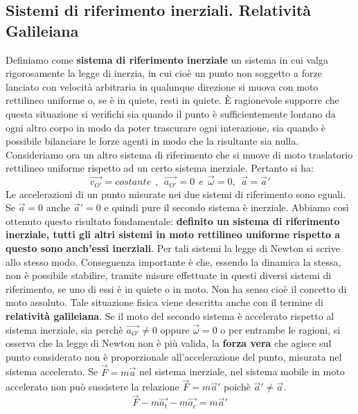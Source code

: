 \documentclass{article}
\numberwithin{equation}{subsection}
\begin{document}
\subsection{Sistemi di riferimento inerziali. Relatività Galileiana}
Definiamo come \textbf{sistema di riferimento inerziale} un sistema in cui valga rigorosamente la legge di inerzia, in cui cioè un punto non soggetto a forze lanciato con velocità arbitraria in qualunque direzione si muova con moto rettilineo uniforme o, se è in quiete, resti in quiete. È ragionevole supporre che questa situazione si verifichi sia quando il punto è sufficientemente lontano da ogni altro corpo in modo da poter trascurare ogni interazione, sia quando è possibile bilanciare le forze agenti in modo che la risultante sia nulla. Consideriamo ora un altro sistema di riferimento che si muove di moto traslatorio rettilineo uniforme rispetto ad un certo sistema inerziale. Pertanto si ha:
\begin{equation}
    \vec{v_{O'}}=costante \ \ ,\ \ \vec{a_{O'}}=0 \ \ e \ \ \vec{\omega}=0 , \ \ \vec{a}=\vec{a}'
\end{equation}
Le accelerazioni di un punto misurate nei due sistemi di riferimento sono eguali. Se $\vec{a}=0$ anche $\vec{a}'=0$ e quindi pure il secondo sistema è inerziale. Abbiamo così ottenuto questo risultato fondamentale: \textbf{definito un sistema di riferimento inerziale, tutti gli altri sistemi in moto rettilineo uniforme rispetto a questo sono anch'essi inerziali}. Per tali sistemi la legge di Newton si scrive allo stesso modo. Conseguenza importante è che, essendo la dinamica la stessa, non è possibile stabilire, tramite misure effettuate in questi diversi sistemi di riferimento, se uno di essi è in quiete o in moto. Non ha senso cioè il concetto di moto assoluto. Tale situazione fisica viene descritta anche con il termine di \textbf{relatività galileiana}. Se il moto del secondo sistema è accelerato rispetto al sistema inerziale, sia perchè $\vec{a_{O'}}\neq0$ oppure $\vec{\omega}=0$ o per entrambe le ragioni, si osserva che la legge di Newton non è più valida, la \textbf{forza vera} che agisce sul punto considerato non è proporzionale all'accelerazione del punto, misurata nel sistema accelerato. Se $\vec{F}=m\vec{a}$ nel sistema inerziale, nel sistema mobile in moto accelerato non può sussistere la relazione $\vec{F}=m\vec{a}'$ poichè $\vec{a}'\neq \vec{a}$.
\begin{equation}
    \vec{F}-m\vec{a_t}-m\vec{a_c}=m\vec{a}'
\end{equation}
\end{document}
